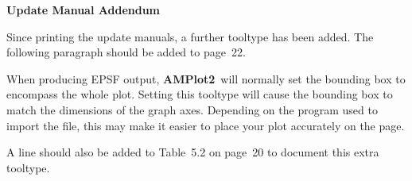 \newcommand{\amplot}{\mbox{\bf AMPlot2}}

\fromaddress
\begin{center}
\LARGE\bf Update Manual Addendum
\end{center}
\vspace{1in}

Since printing the update manuals, a further tooltype has been added. The following
paragraph should be added to page~22.
\vspace{1in}

\vspace{1em}

\noindent When producing EPSF output, \amplot\ will normally set the bounding box to encompass 
the whole plot. Setting this tooltype will cause the bounding box to match the 
dimensions of the graph axes. Depending on the program used to import the file, this 
may make it easier to place your plot accurately on the page.
\vspace{1in}
   
A line should also be added to Table~5.2 on page~20 to document this extra tooltype.


